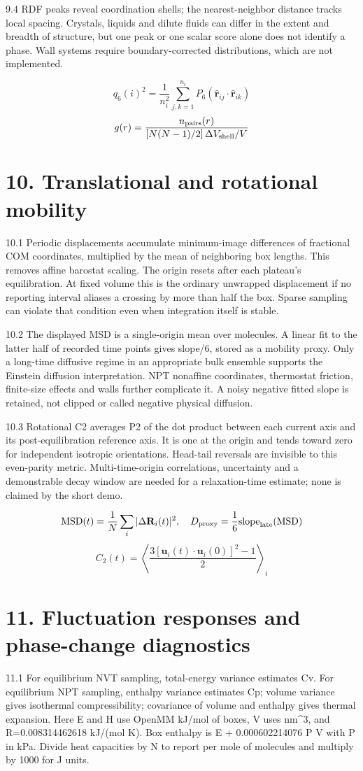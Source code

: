 \documentclass[11pt]{article}
\begin{document}
9.4 RDF peaks reveal coordination shells; the nearest-neighbor distance tracks local spacing. Crystals, liquids and dilute fluids can differ in the extent and breadth of structure, but one peak or one scalar score alone does not identify a phase. Wall systems require boundary-corrected distributions, which are not implemented.


\[q_6(i)^2=\frac{1}{n_i^2}\sum_{j,k=1}^{n_i}P_6(\hat{\mathbf{r}}_{ij}\cdot\hat{\mathbf{r}}_{ik})\]
\[g(r)=\frac{n_{\rm pairs}(r)}{[N(N-1)/2]\,\Delta V_{\rm shell}/V}\]
\section*{10. Translational and rotational mobility}
10.1 Periodic displacements accumulate minimum-image differences of fractional COM coordinates, multiplied by the mean of neighboring box lengths. This removes affine barostat scaling. The origin resets after each plateau's equilibration. At fixed volume this is the ordinary unwrapped displacement if no reporting interval aliases a crossing by more than half the box. Sparse sampling can violate that condition even when integration itself is stable.


10.2 The displayed MSD is a single-origin mean over molecules. A linear fit to the latter half of recorded time points gives slope/6, stored as a mobility proxy. Only a long-time diffusive regime in an appropriate bulk ensemble supports the Einstein diffusion interpretation. NPT nonaffine coordinates, thermostat friction, finite-size effects and walls further complicate it. A noisy negative fitted slope is retained, not clipped or called negative physical diffusion.


10.3 Rotational C2 averages P2 of the dot product between each current axis and its post-equilibration reference axis. It is one at the origin and tends toward zero for independent isotropic orientations. Head-tail reversals are invisible to this even-parity metric. Multi-time-origin correlations, uncertainty and a demonstrable decay window are needed for a relaxation-time estimate; none is claimed by the short demo.


\[\mathrm{MSD}(t)=\frac{1}{N}\sum_i|\Delta\mathbf{R}_i(t)|^2,\quad D_{\rm proxy}=\frac{1}{6}\mathrm{slope}_{\rm late}(\mathrm{MSD})\]
\[C_2(t)=\left\langle\frac{3[\mathbf{u}_i(t)\cdot\mathbf{u}_i(0)]^2-1}{2}\right\rangle_i\]
\section*{11. Fluctuation responses and phase-change diagnostics}
11.1 For equilibrium NVT sampling, total-energy variance estimates Cv. For equilibrium NPT sampling, enthalpy variance estimates Cp; volume variance gives isothermal compressibility; covariance of volume and enthalpy gives thermal expansion. Here E and H use OpenMM kJ/mol of boxes, V uses nm\textasciicircum{}3, and R=0.008314462618 kJ/(mol K). Box enthalpy is E + 0.000602214076 P V with P in kPa. Divide heat capacities by N to report per mole of molecules and multiply by 1000 for J units.
\end{document}
